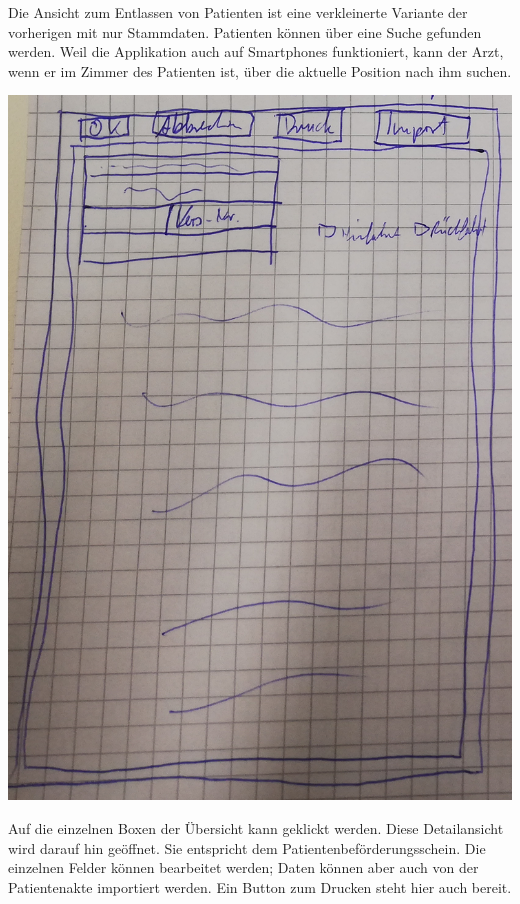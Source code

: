 \documentclass[a4paper, ngerman, 12pt]{scrartcl}
\begin{document}
Die Ansicht zum Entlassen von Patienten ist eine verkleinerte Variante der vorherigen mit nur Stammdaten. Patienten können über eine Suche gefunden werden. Weil die Applikation auch auf Smartphones funktioniert, kann der Arzt, wenn er im Zimmer des Patienten ist, über die aktuelle Position nach ihm suchen.\\[1.5em]
\begin{minipage}{0.4\textwidth}
	\centering
	\includegraphics[width=\textwidth]{Bilder/flaxxy.jpg}
	\label{img:richter2}
\end{minipage}
\hspace{0.05\textwidth}
\begin{minipage}{0.55\textwidth}
Auf die einzelnen Boxen der Übersicht kann geklickt werden. Diese Detailansicht wird darauf hin geöffnet. Sie entspricht dem Patientenbeförderungsschein. Die einzelnen Felder können bearbeitet werden; Daten können aber auch von der Patientenakte importiert werden. Ein Button zum Drucken steht hier auch bereit.\vspace{5cm}\\
\end{minipage}
\end{document}
